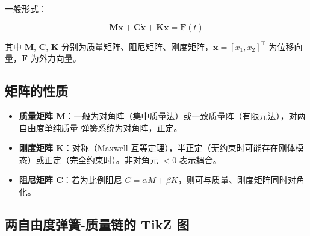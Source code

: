 一般形式：

\begin{myformula}
\[
\mathbf{M}\ddot{\mathbf{x}} + \mathbf{C}\dot{\mathbf{x}} + \mathbf{K}\mathbf{x} = \mathbf{F}(t)
\]
\end{myformula}

其中 $\mathbf{M}$, $\mathbf{C}$, $\mathbf{K}$ 分别为质量矩阵、阻尼矩阵、刚度矩阵，$\mathbf{x} = [x_1, x_2]^{\top}$ 为位移向量，$\mathbf{F}$ 为外力向量。

\subsection{矩阵的性质}

\begin{itemize}
\item \textbf{质量矩阵 $\mathbf{M}$}：一般为对角阵（集中质量法）或一致质量阵（有限元法），对两自由度单纯质量-弹簧系统为对角阵，正定。
\item \textbf{刚度矩阵 $\mathbf{K}$}：对称（Maxwell 互等定理），半正定（无约束时可能存在刚体模态）或正定（完全约束时）。非对角元 $<0$ 表示耦合。
\item \textbf{阻尼矩阵 $\mathbf{C}$}：若为比例阻尼 $C = \alpha M + \beta K$，则可与质量、刚度矩阵同时对角化。
\end{itemize}

\subsection{两自由度弹簧-质量链的 TikZ 图}

